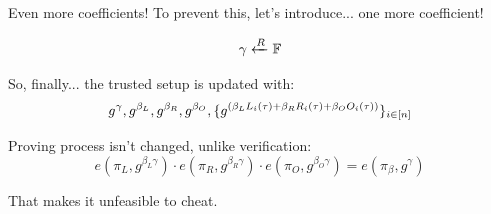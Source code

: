 \documentclass{zkdl-presentation-template}
\begin{document}
    \begin{frame}{Even more coefficients!}
        To prevent this, let's introduce... one more coefficient!
        \vspace{-5pt}

        \begin{equation*}
            \gamma \xleftarrow{R} \mathbb{F}
            \vspace{-5pt}
        \end{equation*}

        \pause
        So, finally... the trusted setup is updated with:
        \vspace{-5pt}
        \begin{equation*}
            g^{\gamma}, g^{\beta_L}, g^{\beta_R}, g^{\beta_O}, \{g^{\left( \beta_LL_i(\tau) + \beta_RR_i(\tau) + \beta_OO_i(\tau) \right)}\}_{i \in \left[ n \right]}
            \vspace{-5pt}
        \end{equation*}

        \pause
        Proving process isn't changed, unlike verification:
        \begin{equation*}
            e(\pi_L, g^{\beta_L\gamma}) \cdot e(\pi_R, g^{\beta_R\gamma}) \cdot e(\pi_O, g^{\beta_O\gamma}) = e(\pi_{\beta}, g^{\gamma})
        \end{equation*}

        That makes it unfeasible to cheat.
    \end{frame}
\end{document}
